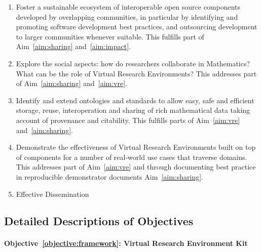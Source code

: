 \documentclass[noworkareas,deliverables,keys]{euproposal}                  %
\begin{document}
\begin{proposal}
\begin{enumerate}

\item \label{objective:sustainable} Foster a sustainable ecosystem of
  interoperable open source components developed by overlapping
  communities, in particular by identifying and promoting software
  development best practices, and outsourcing development to larger
  communities whenever suitable. This fulfills part of
  Aim~\ref{aim:sharing} and~\ref{aim:impact}.

\item \label{objective:social} Explore the social aspects: how do
  researchers collaborate in Mathematics? What can be the role of
  Virtual Research Environments?  This addresses part of
  Aim~\ref{aim:sharing} and~\ref{aim:vre}.

\item \label{objective:data} Identify and extend ontologies and
  standards to allow easy, safe and efficient storage, reuse,
  interoperation and sharing of rich mathematical data taking account
  of provenance and citability. This fulfills parts of
  Aim~\ref{aim:vre} and~\ref{aim:sharing}. 

\item \label{objective:demo}Demonstrate the effectiveness of Virtual
  Research Environments built on top of \TheProject components for a
  number of real-world use cases that traverse domains. This addresses
  part of Aim~\ref{aim:vre} and through documenting best practice in
  reproducible demonstrator documents Aim~\ref{aim:sharing}.

\item \label{objective:disseminate}Effective Dissemination

\end{enumerate}

\subsection*{Detailed Descriptions of Objectives} %

\paragraph{Objective~\ref{objective:framework}: Virtual Research
  Environment Kit}\ 


\end{proposal}
\end{document}
